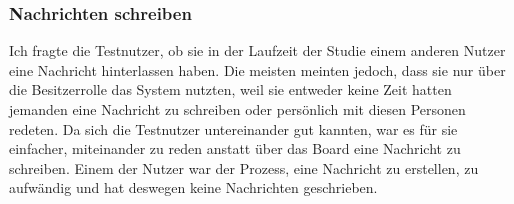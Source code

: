 




\subsubsection{Nachrichten schreiben}\label{Nachrichten schreiben}
Ich fragte die Testnutzer, ob sie in der Laufzeit der Studie einem anderen Nutzer eine Nachricht hinterlassen haben.
Die meisten meinten jedoch, dass sie nur über die Besitzerrolle das System nutzten, weil sie entweder keine Zeit hatten jemanden eine Nachricht zu schreiben oder persönlich mit diesen Personen redeten.
Da sich die Testnutzer untereinander gut kannten, war es für sie einfacher, miteinander zu reden anstatt über das Board eine Nachricht zu schreiben.
Einem der Nutzer war der Prozess, eine Nachricht zu erstellen, zu aufwändig und hat deswegen keine Nachrichten geschrieben.

